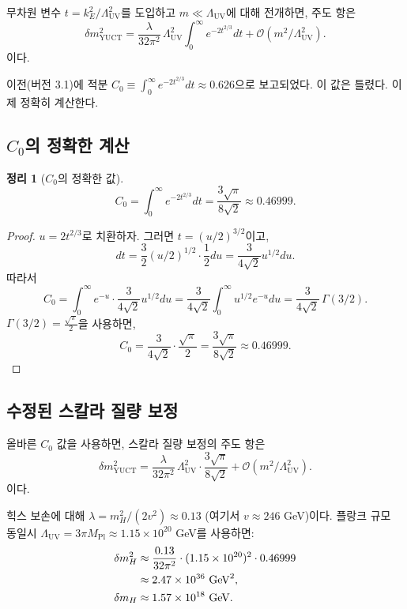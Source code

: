 \documentclass[11pt,a4paper]{article}
\newcommand{\Mpl}{M_{\mathrm{Pl}}}
\newcommand{\LUV}{\Lambda_{\mathrm{UV}}}
\newtheorem{theorem}{정리}[section]
\theoremstyle{remark}
\begin{document}
	무차원 변수 \(t = k_E^2/\LUV^2\)를 도입하고 \(m \ll \LUV\)에 대해 전개하면, 주도 항은
	\begin{equation}
		\delta m^2_{\mathrm{YUCT}} = \frac{\lambda}{32\pi^2}\,\LUV^2 \int_0^{\infty} e^{-2t^{2/3}} dt + \mathcal{O}(m^2/\LUV^2).
		\label{eq:scalar_lead}
	\end{equation}
	이다.
	
	이전(버전 3.1)에 적분 \(C_0 \equiv \int_0^{\infty} e^{-2t^{2/3}} dt \approx 0.626\)으로 보고되었다. 이 값은 틀렸다. 이제 정확히 계산한다.
	
	\subsection{\(C_0\)의 정확한 계산}
	
	\begin{theorem}[\(C_0\)의 정확한 값]
		\label{thm:C0}
		\[
		C_0 = \int_0^{\infty} e^{-2t^{2/3}} dt = \frac{3\sqrt{\pi}}{8\sqrt{2}} \approx 0.46999.
		\]
	\end{theorem}
	
	\begin{proof}
		\(u = 2t^{2/3}\)로 치환하자. 그러면 \(t = (u/2)^{3/2}\)이고,
		\[
		dt = \frac{3}{2} (u/2)^{1/2} \cdot \frac{1}{2} du = \frac{3}{4\sqrt{2}} u^{1/2} du.
		\]
		따라서
		\[
		C_0 = \int_0^{\infty} e^{-u} \cdot \frac{3}{4\sqrt{2}} u^{1/2} du = \frac{3}{4\sqrt{2}} \int_0^{\infty} u^{1/2} e^{-u} du = \frac{3}{4\sqrt{2}} \, \Gamma(3/2).
		\]
		\(\Gamma(3/2) = \frac{\sqrt{\pi}}{2}\)을 사용하면,
		\[
		C_0 = \frac{3}{4\sqrt{2}} \cdot \frac{\sqrt{\pi}}{2} = \frac{3\sqrt{\pi}}{8\sqrt{2}} \approx 0.46999.
		\]
	\end{proof}
	
	\subsection{수정된 스칼라 질량 보정}
	
	올바른 \(C_0\) 값을 사용하면, 스칼라 질량 보정의 주도 항은
	\begin{equation}
		\boxed{\delta m^2_{\mathrm{YUCT}} = \frac{\lambda}{32\pi^2}\,\LUV^2 \cdot \frac{3\sqrt{\pi}}{8\sqrt{2}} + \mathcal{O}(m^2/\LUV^2)}.
		\label{eq:scalar_corrected}
	\end{equation}
	이다.
	
	힉스 보손에 대해 \(\lambda = m_H^2/(2v^2) \approx 0.13\) (여기서 \(v \approx 246\) GeV)이다. 플랑크 규모 동일시 \(\LUV = 3\pi\Mpl \approx 1.15\times 10^{20}\) GeV를 사용하면:
	\begin{align}
		\delta m^2_H &\approx \frac{0.13}{32\pi^2} \cdot (1.15\times 10^{20})^2 \cdot 0.46999 \notag\\
		&\approx 2.47 \times 10^{36}\ \mathrm{GeV}^2, \notag\\
		\delta m_H &\approx 1.57 \times 10^{18}\ \mathrm{GeV}.
		\label{eq:planck_correction}
	\end{align}
	
\end{document}
